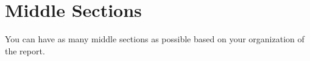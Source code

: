 \section{Middle Sections}

You can have as many middle sections as possible based on your organization of the report.
